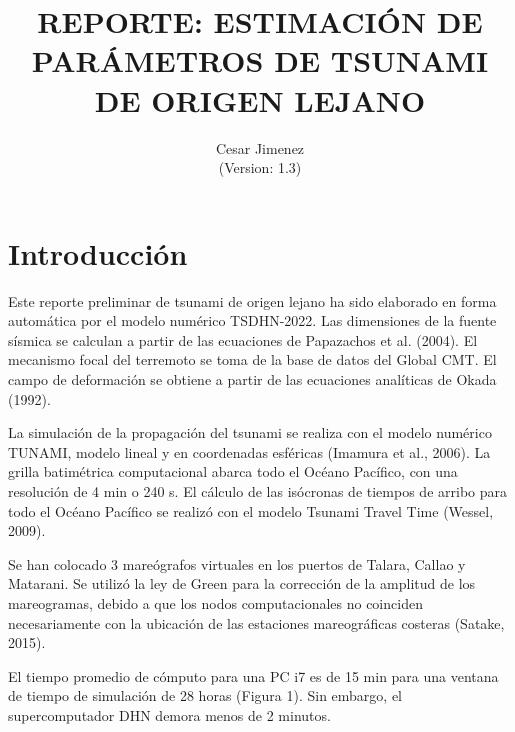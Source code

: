 \documentclass[a4paper,11pt]{article}
\title{REPORTE: ESTIMACIÓN DE PARÁMETROS DE TSUNAMI DE ORIGEN LEJANO}
\author{Cesar Jimenez \\
 (Version: 1.3)}
\begin{document}
 \renewcommand{\tablename}{Tabla}
 \maketitle
 \section*{Introducción}
 \noindent
 Este reporte preliminar de tsunami de origen lejano ha sido 
 elaborado en forma automática por el modelo numérico TSDHN-2022.
 Las dimensiones de la fuente sísmica se calculan a partir de las ecuaciones de
  Papazachos et al. (2004).
 El mecanismo focal del terremoto se toma de la base de datos del Global CMT.
 El campo de deformación se obtiene a partir de las ecuaciones analíticas de
  Okada (1992).
  
 La simulación de la propagación del tsunami se realiza con el modelo 
 numérico TUNAMI, modelo lineal y en coordenadas esféricas (Imamura et al.,
  2006). La grilla batimétrica computacional abarca todo el Océano Pacífico, 
 con una resolución de 4 min o 240 s. El cálculo de las isócronas de 
 tiempos de arribo para todo el Océano Pacífico se realizó con el modelo 
 Tsunami Travel Time (Wessel, 2009).
  
 Se han colocado 3 mareógrafos virtuales en los puertos de Talara, Callao y 
 Matarani. Se utilizó la ley de Green para la corrección de la amplitud de 
 los mareogramas, debido a que los nodos computacionales no coinciden 
 necesariamente con la ubicación de las estaciones mareográficas costeras 
 (Satake, 2015).
  
 El tiempo promedio de cómputo para una PC i7 es de 15 min para una ventana 
 de tiempo de simulación de 28 horas (Figura 1). Sin embargo, el 
 supercomputador DHN demora menos de 2 minutos. \\
  
\end{document}
